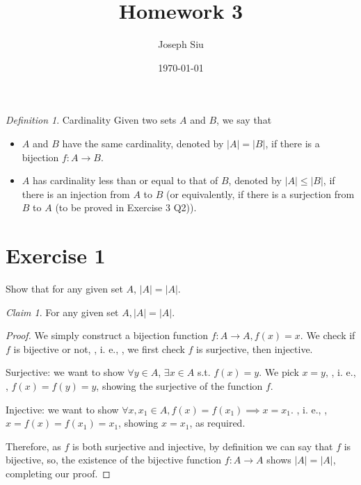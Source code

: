 \documentclass{homework}
\author{Joseph Siu}
\date{\today}
\title{Homework 3}
\newcommand*{\ie}{\leavevmode\unskip, i. e., \ignorespaces} %
\newcommand{\ra}{\rightarrow}
\newcommand{\?}{\stackrel{?}{=}}
\theoremstyle{remark}
\newtheorem*{claim}{Claim}
\newtheorem*{definition}{Definition}
\begin{document}
 \maketitle

\begin{definition}
    Cardinality Given two sets $A$ and $B$, we say that
    \begin{itemize}
        \item $A$ and $B$ have the same cardinality, denoted by $|A|=|B|$, if there is a bijection $f:A\rightarrow B$.
        \item $A$ has cardinality less than or equal to that of $B$, denoted by $|A|\leq|B|$, if there is an injection from $A$ to $B$ (or equivalently, if there is a surjection from $B$ to $A$ (to be proved in Exercise 3 Q2)).
    \end{itemize}
\end{definition}
\section*{Exercise 1}

\question Show that for any given set $A$, $|A|=|A|$.
\begin{claim}
    For any given set $A, |A|=|A|$.
\end{claim}
\begin{proof}
    We simply construct a bijection function $f: A\ra A, f(x)=x$. We check if $f$ is bijective or not, \ie, we first check $f$ is surjective, then injective. 

    Surjective: we want to show $\forall y\in A$, $\exists x\in A$ s.t. $f(x)=y$. We pick $x=y$, \ie, $f(x)=f(y)=y$, showing the surjective of the function $f$.

    Injective: we want to show $\forall x,x_1\in A, f(x)=f(x_1)\implies x=x_1$. \ie, $x=f(x)=f(x_1)=x_1$, showing $x=x_1$, as required. 

    Therefore, as $f$ is both surjective and injective, by definition we can say that $f$ is bijective, so, the existence of the bijective function $f:A\ra A$ shows $|A|=|A|$, completing our proof. 
\end{proof}
\end{document}
